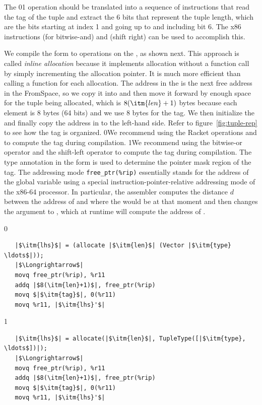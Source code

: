 \documentclass[7x10]{TimesAPriori_MIT}%
\def\racketEd{0}
\def\pythonEd{1}
\providecommand{\BookEdition}{1}
\let\edition\BookEdition
\newcommand{\racket}[1]{{\if\edition\racketEd{#1}\fi}}
\newcommand{\pythonColor}[0]{}
\newcommand{\python}[1]{{\if\edition\pythonEd\pythonColor #1\fi}}
\numberwithin{theorem}{chapter}
\numberwithin{definition}{chapter}
\numberwithin{equation}{chapter}
\begin{document}
The \racket{}\python{} operation should
be translated into a sequence of instructions that read the tag of the
tuple and extract the 6 bits that represent the tuple length, which
are the bits starting at index 1 and going up to and including bit 6.
The x86 instructions  (for bitwise-and) and 
(shift right) can be used to accomplish this.

We compile the  form to operations on the
, as shown next.  This approach is called
\emph{inline allocation} because it implements allocation without a
function call by simply incrementing the allocation pointer. It is much
more efficient than calling a function for each allocation. The
address in the  is the next free address in the
FromSpace, so we copy it into  and then move it forward by
enough space for the tuple being allocated, which is $8(\itm{len}+1)$
bytes because each element is 8 bytes (64 bits) and we use 8 bytes for
the tag.  We then initialize the  and finally copy the
address in  to the left-hand side. Refer to
figure~\ref{fig:tuple-rep} to see how the tag is organized.
%
\racket{We recommend using the Racket operations
\code{bitwise-ior} and \code{arithmetic-shift} to compute the tag
during compilation.}
%
\python{We recommend using the bitwise-or operator \code{|} and the
  shift-left operator \code{<<} to compute the tag during
  compilation.}
%
The type annotation in the  form is used to determine
the pointer mask region of the tag.
%
The addressing mode \verb!free_ptr(%rip)! essentially stands for the
address of the  global variable using a special
instruction-pointer-relative addressing mode of the x86-64 processor.
In particular, the assembler computes the distance $d$ between the
address of  and where the  would be at that
moment and then changes the  argument to
, which at runtime will compute the address of
.
%
{\if\edition\racketEd
\begin{lstlisting}
   |$\itm{lhs}$| = (allocate |$\itm{len}$| (Vector |$\itm{type} \ldots$|));
   |$\Longrightarrow$|
   movq free_ptr(%rip), %r11
   addq |$8(\itm{len}+1)$|, free_ptr(%rip)
   movq $|$\itm{tag}$|, 0(%r11)
   movq %r11, |$\itm{lhs}'$|
\end{lstlisting}
\fi}
{\if\edition\pythonEd\pythonColor    
\begin{lstlisting}
   |$\itm{lhs}$| = allocate(|$\itm{len}$|, TupleType([|$\itm{type}, \ldots$])|);
   |$\Longrightarrow$|
   movq free_ptr(%rip), %r11
   addq |$8(\itm{len}+1)$|, free_ptr(%rip)
   movq $|$\itm{tag}$|, 0(%r11)
   movq %r11, |$\itm{lhs}'$|
\end{lstlisting}
\fi}
\end{document}
